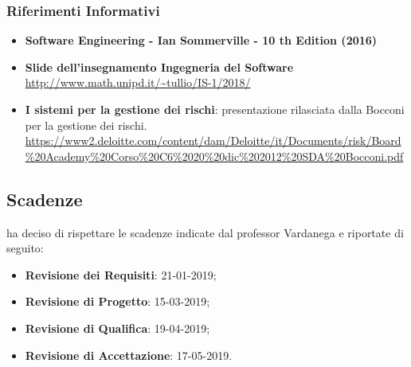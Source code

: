 		\subsubsection{Riferimenti Informativi}
			\begin{itemize}
				\item \textbf{Software Engineering - Ian Sommerville - 10 th Edition (2016)}
				\item \textbf{Slide dell’insegnamento Ingegneria del Software}\\
				\url{http://www.math.unipd.it/~tullio/IS-1/2018/}
				\item \textbf{I sistemi per la gestione dei rischi}: presentazione rilasciata dalla Bocconi per la gestione dei rischi.\\
				\url{https://www2.deloitte.com/content/dam/Deloitte/it/Documents/risk/Board\%20Academy\%20Corso\%20C6\%2020\%20dic\%202012\%20SDA\%20Bocconi.pdf}
			\end{itemize}
		
	\subsection{Scadenze}
	\gruppo ha deciso di rispettare le scadenze indicate dal professor Vardanega e riportate di seguito:
	\begin{itemize}
		\item \textbf{Revisione dei Requisiti}: 21-01-2019;
		\item \textbf{Revisione di Progetto}: 15-03-2019;
		\item \textbf{Revisione di Qualifica}: 19-04-2019;
		\item \textbf{Revisione di Accettazione}: 17-05-2019.
	\end{itemize}
	
